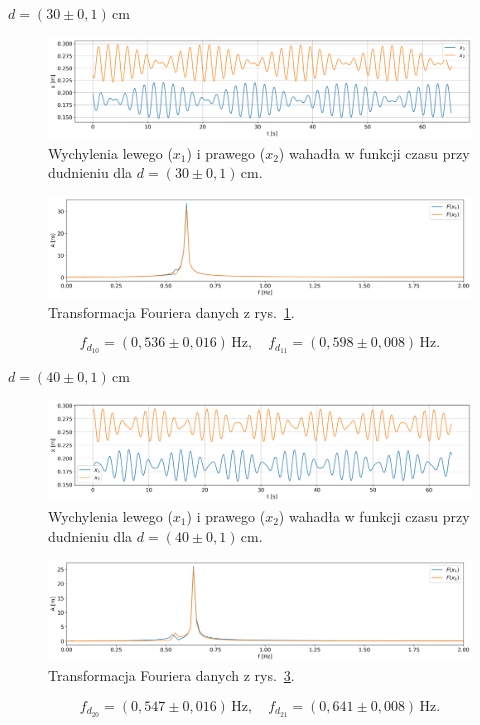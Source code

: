 \documentclass[12pt]{article}
\begin{document}
\(d = (30 \pm 0{,}1)\,\mathrm{cm}\)
\begin{figure}[H]
	\centering
	\includegraphics[width=\linewidth]{beats_1}
	\caption{Wychylenia lewego (\(x_1\)) i prawego (\(x_2\)) wahadła w funkcji czasu przy dudnieniu dla \(d = (30 \pm 0{,}1)\,\mathrm{cm}\).}
	\label{fig:beats_0}
\end{figure}
\begin{figure}[H]
	\centering
	\includegraphics[width=\linewidth]{counterphase_1_fft}
	\caption{Transformacja Fouriera danych z rys.~\ref{fig:beats_0}.}
	\label{fig:coutner_phase_0_fft}
\end{figure}
\[
	f_{d_{10}} = (0{,}536 \pm 0{,}016)\,\mathrm{Hz}, \quad
	f_{d_{11}} = (0{,}598 \pm 0{,}008)\,\mathrm{Hz}.
\]

\newpage

\(d = (40 \pm 0{,}1)\,\mathrm{cm}\)
\begin{figure}[H]
	\centering
	\includegraphics[width=\linewidth]{beats_2}
	\caption{Wychylenia lewego (\(x_1\)) i prawego (\(x_2\)) wahadła w funkcji czasu przy dudnieniu dla \(d = (40 \pm 0{,}1)\,\mathrm{cm}\).}
	\label{fig:beats_1}
\end{figure}
\begin{figure}[H]
	\centering
	\includegraphics[width=\linewidth]{counterphase_2_fft}
	\caption{Transformacja Fouriera danych z rys.~\ref{fig:beats_1}.}
	\label{fig:coutner_phase_1_fft}
\end{figure}
\[
	f_{d_{20}} = (0{,}547 \pm 0{,}016)\,\mathrm{Hz}, \quad
	f_{d_{21}} = (0{,}641 \pm 0{,}008)\,\mathrm{Hz}.
\]
\end{document}
